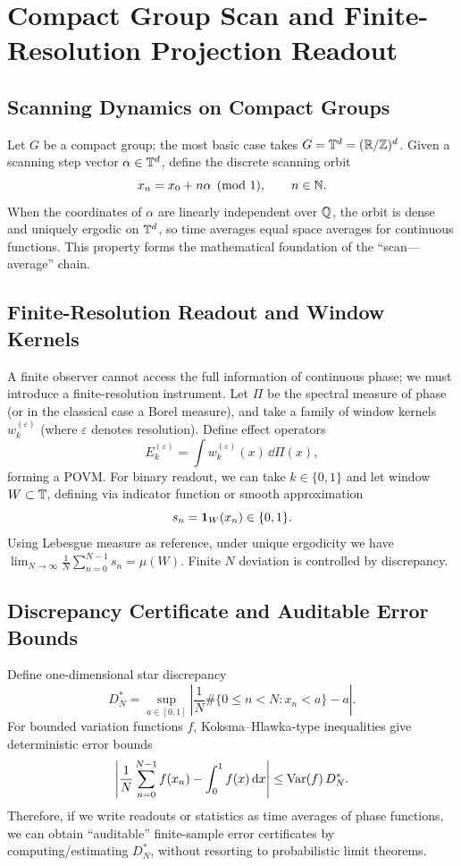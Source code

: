 \section{Compact Group Scan and Finite-Resolution Projection Readout}

\subsection{Scanning Dynamics on Compact Groups}

Let $G$ be a compact group; the most basic case takes $G=\mathbb{T}^d=(\mathbb{R}/\mathbb{Z})^d$. Given a scanning step vector $\alpha\in\mathbb{T}^d$, define the discrete scanning orbit
\[
x_n = x_0 + n\alpha \pmod{1},\qquad n\in\mathbb{N}.
\]
When the coordinates of $\alpha$ are linearly independent over $\mathbb{Q}$, the orbit is dense and uniquely ergodic on $\mathbb{T}^d$, so time averages equal space averages for continuous functions. This property forms the mathematical foundation of the ``scan---average'' chain.

\subsection{Finite-Resolution Readout and Window Kernels}

A finite observer cannot access the full information of continuous phase; we must introduce a finite-resolution instrument. Let $\Pi$ be the spectral measure of phase (or in the classical case a Borel measure), and take a family of window kernels $w_k^{(\varepsilon)}$ (where $\varepsilon$ denotes resolution). Define effect operators
\[
E_k^{(\varepsilon)}=\int w_k^{(\varepsilon)}(x)\,\dd\Pi(x),
\]
forming a POVM. For binary readout, we can take $k\in\{0,1\}$ and let window $W\subset \mathbb{T}$, defining via indicator function or smooth approximation
\[
s_n = \mathbf{1}_W(x_n)\in\{0,1\}.
\]
Using Lebesgue measure as reference, under unique ergodicity we have $\lim_{N\to\infty}\frac1N\sum_{n=0}^{N-1}s_n=\mu(W)$. Finite $N$ deviation is controlled by discrepancy.

\subsection{Discrepancy Certificate and Auditable Error Bounds}

Define one-dimensional star discrepancy
\[
D_N^*=\sup_{a\in[0,1]}\left|\frac1N\#\{0\le n<N:x_n<a\}-a\right|.
\]
For bounded variation functions $f$, Koksma--Hlawka-type inequalities give deterministic error bounds
\[
\left|\frac1N\sum_{n=0}^{N-1}f(x_n)-\int_0^1 f(x)\,\mathrm{d} x\right|\le \mathrm{Var}(f)\,D_N^*.
\]
Therefore, if we write readouts or statistics as time averages of phase functions, we can obtain ``auditable'' finite-sample error certificates by computing/estimating $D_N^*$, without resorting to probabilistic limit theorems.

